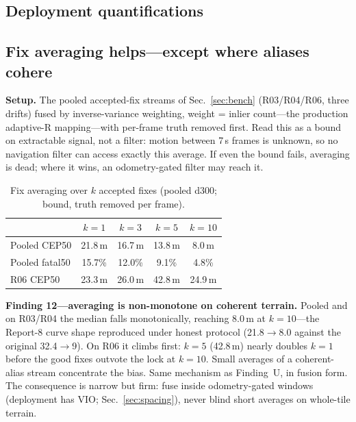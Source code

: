 \documentclass[journal]{IEEEtran}
\begin{document}
\subsection{Deployment quantifications}
\label{sec:app-deploy}
\subsection{Fix averaging helps---except where aliases cohere}
\label{sec:averaging}

\textbf{Setup.} The pooled accepted-fix streams of Sec.~\ref{sec:bench} (R03/R04/R06, three drifts) fused by inverse-variance weighting, weight = inlier count---the production adaptive-R mapping---with per-frame truth removed first. Read this as a bound on extractable signal, not a filter: motion between 7\,s frames is unknown, so no navigation filter can access exactly this average. If even the bound fails, averaging is dead; where it wins, an odometry-gated filter may reach it.

\begin{table}[t]
\caption{Fix averaging over $k$ accepted fixes (pooled d300; bound, truth removed per frame).}
\label{tab:averaging}
\centering
\footnotesize
\begin{tabular}{@{}lcccc@{}}
\toprule
 & $k{=}1$ & $k{=}3$ & $k{=}5$ & $k{=}10$ \\
\midrule
Pooled CEP50 & 21.8\,m & 16.7\,m & 13.8\,m & 8.0\,m \\
Pooled fatal50 & 15.7\% & 12.0\% & 9.1\% & 4.8\% \\
R06 CEP50 & 23.3\,m & 26.0\,m & 42.8\,m & 24.9\,m \\
\bottomrule
\end{tabular}
\end{table}

\textbf{Finding 12---averaging is non-monotone on coherent terrain.} Pooled and on R03/R04 the median falls monotonically, reaching 8.0\,m at $k{=}10$---the Report-8 curve shape reproduced under honest protocol (21.8$\to$8.0 against the original 32.4$\to$9). On R06 it climbs first: $k{=}5$ (42.8\,m) nearly doubles $k{=}1$ before the good fixes outvote the lock at $k{=}10$. Small averages of a coherent-alias stream concentrate the bias. Same mechanism as Finding~U, in fusion form. The consequence is narrow but firm: fuse inside odometry-gated windows (deployment has VIO; Sec.~\ref{sec:spacing}), never blind short averages on whole-tile terrain.
\end{document}
